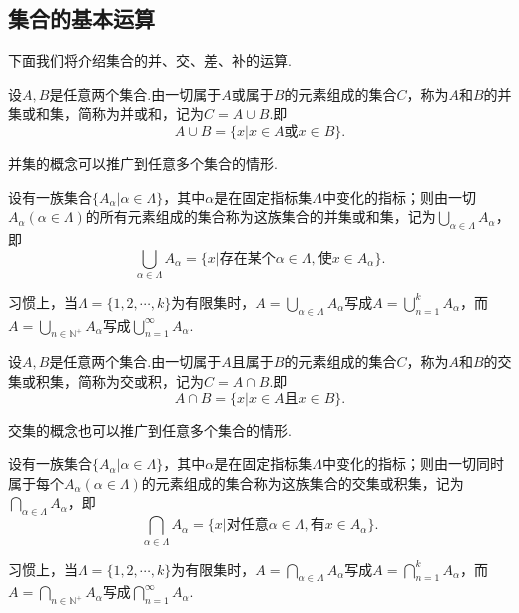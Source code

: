 \subsection{集合的基本运算}
下面我们将介绍集合的并、交、差、补的运算.
\begin{definition}[并集]
	设$A,B$是任意两个集合.由一切属于$A$或属于$B$的元素组成的集合$C$，称为$A$和$B$的{\heiti 并集}或{\heiti 和集}，简称为{\heiti 并}或{\heiti 和}，记为$C=A\cup B$.即
	$$A\cup B=\{x|x\in A\text{或}x\in B\}.$$
\end{definition}
并集的概念可以推广到任意多个集合的情形.
\begin{definition}[推广的并集]
	设有一族集合$\{A_\alpha|\alpha\in\Lambda\}$，其中$\alpha$是在固定指标集$\Lambda$中变化的指标；则由一切$A_\alpha(\alpha\in\Lambda)$的所有元素组成的集合称为这族集合的并集或和集，记为$\bigcup\limits_{\alpha\in\Lambda}A_\alpha$，即
	$$\bigcup_{\alpha\in\Lambda}A_\alpha=\{x|\text{存在某个}\alpha\in\Lambda,\text{使}x\in A_\alpha\}.$$
\end{definition}
习惯上，当$\Lambda=\{1,2,\cdots,k\}$为有限集时，$A=\bigcup\limits_{\alpha\in\Lambda}A_\alpha$写成$A=\bigcup\limits_{n=1}^{k}A_\alpha$，而$A=\bigcup\limits_{n\in\mathbb{N}^+}A_\alpha$写成$\bigcup\limits_{n=1}^{\infty}A_\alpha$.
\begin{definition}[交集]
	设$A,B$是任意两个集合.由一切属于$A$且属于$B$的元素组成的集合$C$，称为$A$和$B$的{\heiti 交集}或{\heiti 积集}，简称为{\heiti 交}或{\heiti 积}，记为$C=A\cap B$.即
	$$A\cap B=\{x|x\in A\text{且}x\in B\}.$$
\end{definition}
交集的概念也可以推广到任意多个集合的情形.
\begin{definition}[推广的交集]
	设有一族集合$\{A_\alpha|\alpha\in\Lambda\}$，其中$\alpha$是在固定指标集$\Lambda$中变化的指标；则由一切同时属于每个$A_\alpha(\alpha\in\Lambda)$的元素组成的集合称为这族集合的交集或积集，记为$\bigcap\limits_{\alpha\in\Lambda}A_\alpha$，即
	$$\bigcap_{\alpha\in\Lambda}A_\alpha=\{x|\text{对任意}\alpha\in\Lambda,\text{有}x\in A_\alpha\}.$$
\end{definition}
习惯上，当$\Lambda=\{1,2,\cdots,k\}$为有限集时，$A=\bigcap\limits_{\alpha\in\Lambda}A_\alpha$写成$A=\bigcap\limits_{n=1}^{k}A_\alpha$，而$A=\bigcap\limits_{n\in\mathbb{N}^+}A_\alpha$写成$\bigcap\limits_{n=1}^{\infty}A_\alpha$.

